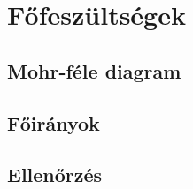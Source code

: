 \section{Főfeszültségek}

\subsection{Mohr-féle diagram}

\subsection{Főirányok}

\subsection{Ellenőrzés}
